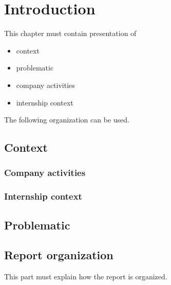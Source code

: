 \chapter{Introduction}

This chapter must contain presentation of 

\begin{itemize}
	\item context
	\item problematic
	\item company  activities
	\item internship context 
\end{itemize}

The following organization can be used.



\section{Context}

\vspace*{1cm}

\subsection{Company activities}


\vspace*{1cm}

\subsection{Internship context}


\vspace*{1cm}



\section{Problematic}

\vspace*{1cm}











\section{Report organization}

This part must explain how the report is organized.
